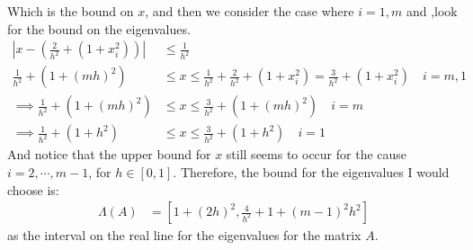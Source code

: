 \documentclass[]{article}
\begin{document}
        Which is the bound on $x$, and then we consider the case where $i = 1, m$ and ,look for the bound on the eigenvalues. 
        \begin{align*}\tag{2.a.5}\label{eqn:2.a.5}
            \left| 
                x - \left(
                    \frac{2}{h^2} + (1 + x_i^2)
                \right) 
            \right| &\le \frac{1}{h^2}
            \\
            \frac{1}{h^2} + (1 + (mh)^2) &\le  x 
            \le     \frac{1}{h^2} + \frac{2}{h^2}
            + (1 + x_i^2)
            = \frac{3}{h^2} + (1 + x_i^2) \quad i = m, 1
            \\\implies
            \frac{1}{h^2} + (1 + (mh)^2) &\le x \le 
            \frac{3}{h^2} + (1 + (mh)^2) \quad i = m
            \\\implies 
            \frac{1}{h^2} + (1 + h^2) &\le x \le 
            \frac{3}{h^2} + (1 + h^2) \quad i = 1
        \end{align*}
        And notice that the upper bound for $x$ still seems to occur for the cause $i = 2, \cdots, m - 1$, for $h\in [0, 1]$. Therefore, the bound for the eigenvalues I would choose is: 
        \begin{align*}\tag{2.a.6}\label{eqn:2.a.6}
            \Lambda(A) &= 
            \left[
                1 + (2h)^2, 
                \frac{4}{h^2} + 1 + (m -1)^2h^2
            \right]
        \end{align*}
        as the interval on the real line for the eigenvalues for the matrix $A$. 
\end{document}
